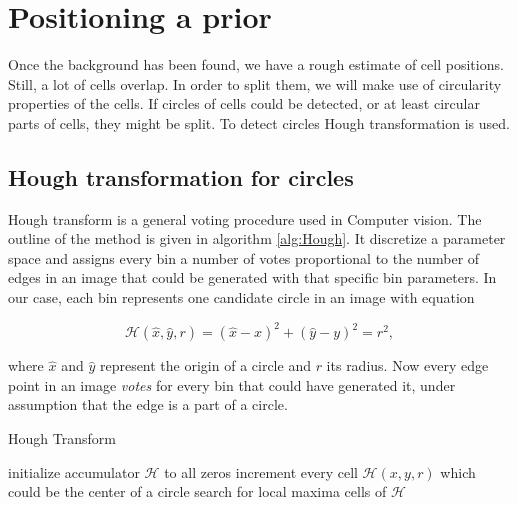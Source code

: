 
\section{Positioning a prior}

Once the background has been found, we have a rough estimate of cell positions. Still, a lot of cells overlap. In order to split them, we will make use of circularity properties of the cells. If circles of cells could be detected, or at least circular parts of cells, they might be split. To detect circles Hough transformation is used.

\subsection{Hough transformation for circles}

Hough transform is a general voting procedure used in Computer vision. The outline of the method is given in algorithm \ref{alg:Hough}. It discretize a parameter space and assigns every bin a number of votes proportional to the number of edges in an image that could be generated with that specific bin parameters. In our case, each bin represents one candidate circle in an image with equation 

\begin{equation}
	\mathcal{H}(\hat{x}, \hat{y}, r) = (\hat{x} - x)^2 + (\hat{y} - y)^2 = r^2,
\end{equation}

where  $\hat{x}$ and $\hat{y}$ represent the origin of a circle and $r$ its radius. Now every edge point in an image \textit{votes} for every bin that could have generated it, under assumption that the edge is a part of a circle. \\

\begin{algorithm}
	\caption{Hough Transform}
 	\label{alg:Hough}
 	\begin{algorithmic}[1]
 		\State initialize accumulator $\mathcal{H}$ to all zeros
 			\State increment every cell $\mathcal{H}(x,y,r)$ which could be the center of a circle
 		\EndFor
 		\State search for local maxima cells of $\mathcal{H}$
 	\EndFunction
\end{algorithmic}
\end{algorithm}

